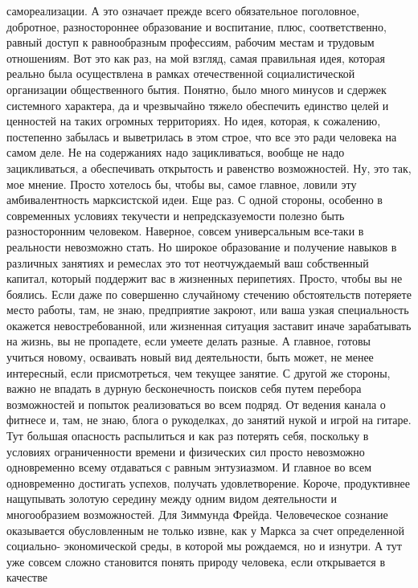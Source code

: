 самореализации. А это означает прежде всего обязательное поголовное, добротное,
разностороннее образование и воспитание, плюс, соответственно, равный доступ к
равнообразным профессиям, рабочим местам и трудовым отношениям. Вот это как раз,
на мой взгляд, самая правильная идея, которая реально была осуществлена в рамках
отечественной социалистической организации общественного бытия. Понятно, было
много минусов и сдержек системного характера, да и чрезвычайно тяжело обеспечить
единство целей и ценностей на таких огромных территориях. Но идея, которая, к
сожалению, постепенно забылась и выветрилась в этом строе, что все это ради
человека на самом деле. Не на содержаниях надо зацикливаться, вообще не надо
зацикливаться, а обеспечивать открытость и равенство возможностей. Ну, это так,
мое мнение. Просто хотелось бы, чтобы вы, самое главное, ловили эту
амбивалентность марксистской идеи. Еще раз. С одной стороны, особенно в
современных условиях текучести и непредсказуемости полезно быть разносторонним
человеком. Наверное, совсем универсальным все-таки в реальности невозможно
стать. Но широкое образование и получение навыков в различных занятиях и
ремеслах это тот неотчуждаемый ваш собственный капитал, который поддержит вас в
жизненных перипетиях. Просто, чтобы вы не боялись. Если даже по совершенно
случайному стечению обстоятельств потеряете место работы, там, не знаю,
предприятие закроют, или ваша узкая специальность окажется невостребованной, или
жизненная ситуация заставит иначе зарабатывать на жизнь, вы не пропадете, если
умеете делать разные. А главное, готовы учиться новому, осваивать новый вид
деятельности, быть может, не менее интересный, если присмотреться, чем текущее
занятие. С другой же стороны, важно не впадать в дурную бесконечность поисков
себя путем перебора возможностей и попыток реализоваться во всем подряд. От
ведения канала о фитнесе и, там, не знаю, блога о рукоделках, до занятий нукой и
игрой на гитаре. Тут большая опасность распылиться и как раз потерять себя,
поскольку в условиях ограниченности времени и физических сил просто невозможно
одновременно всему отдаваться с равным энтузиазмом. И главное во всем
одновременно достигать успехов, получать удовлетворение. Короче, продуктивнее
нащупывать золотую середину между одним видом деятельности и многообразием
возможностей. Для Зиммунда Фрейда. Человеческое сознание оказывается
обусловленным не только извне, как у Маркса за счет определенной социально-
экономической среды, в которой мы рождаемся, но и изнутри. А тут уже совсем
сложно становится понять природу человека, если открывается в качестве

